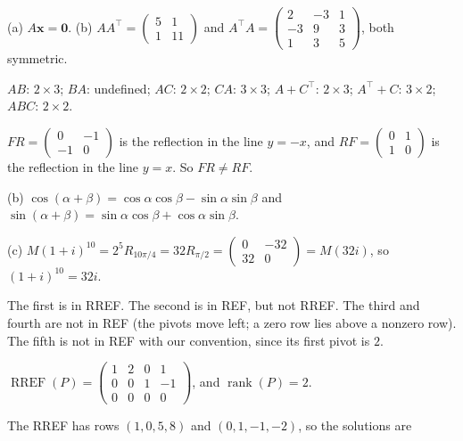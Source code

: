 \documentclass[11pt]{article}
\DeclareMathOperator{\rank}{rank}
\DeclareMathOperator{\RREF}{RREF}
\begin{document}
\begin{description}[leftmargin=0pt, itemsep=0.3em]
    \item[\ref{pr:matvec}.] (a) $A\mathbf{x} = \mathbf{0}$. (b) $AA^\top = \begin{pmatrix} 5 & 1 \\ 1 & 11 \end{pmatrix}$ and $A^\top A = \begin{pmatrix} 2 & -3 & 1 \\ -3 & 9 & 3 \\ 1 & 3 & 5 \end{pmatrix}$, both symmetric.
    \item[\ref{pr:sizes}.] $AB$: $2 \times 3$; $BA$: undefined; $AC$: $2 \times 2$; $CA$: $3 \times 3$; $A + C^\top$: $2 \times 3$; $A^\top + C$: $3 \times 2$; $ABC$: $2 \times 2$.
    \item[\ref{pr:reflect-rotate}.] $FR = \begin{pmatrix} 0 & -1 \\ -1 & 0 \end{pmatrix}$ is the reflection in the line $y = -x$, and $RF = \begin{pmatrix} 0 & 1 \\ 1 & 0 \end{pmatrix}$ is the reflection in the line $y = x$. So $FR \neq RF$.
    \item[\ref{pr:rotation-addition}.] (b) $\cos(\alpha + \beta) = \cos\alpha\cos\beta - \sin\alpha\sin\beta$ and $\sin(\alpha + \beta) = \sin\alpha\cos\beta + \cos\alpha\sin\beta$.
    \item[\ref{pr:complex-matrix}.] (c) $M(1 + i)^{10} = 2^5 R_{10\pi/4} = 32 R_{\pi/2} = \begin{pmatrix} 0 & -32 \\ 32 & 0 \end{pmatrix} = M(32i)$, so $(1 + i)^{10} = 32i$.
    \item[\ref{pr:ref}.] The first is in RREF. The second is in REF, but not RREF. The third and fourth are not in REF (the pivots move left; a zero row lies above a nonzero row). The fifth is not in REF with our convention, since its first pivot is $2$.
    \item[\ref{pr:rref-compute}.] $\RREF(P) = \begin{pmatrix} 1 & 2 & 0 & 1 \\ 0 & 0 & 1 & -1 \\ 0 & 0 & 0 & 0 \end{pmatrix}$, and $\rank(P) = 2$.
    \item[\ref{pr:system}.] The RREF has rows $(1, 0, 5, 8)$ and $(0, 1, -1, -2)$, so the solutions are

\end{description}
\end{document}
